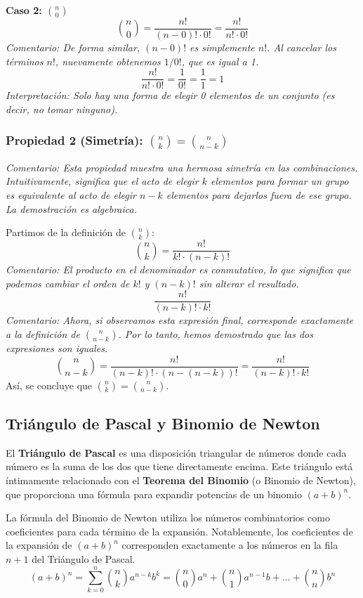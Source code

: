 \documentclass[12pt, letterpaper]{article}
\begin{document}
\vspace{1em}
\noindent \textbf{Caso 2: $\binom{n}{0}$}
\[ \binom{n}{0} = \frac{n!}{(n-0)! \cdot 0!} = \frac{n!}{n! \cdot 0!} \]
\textit{Comentario: De forma similar, $(n-0)!$ es simplemente $n!$. Al cancelar los términos $n!$, nuevamente obtenemos $1/0!$, que es igual a 1.}
\[ \frac{n!}{n! \cdot 0!} = \frac{1}{0!} = \frac{1}{1} = 1 \]
\textit{Interpretación: Solo hay una forma de elegir 0 elementos de un conjunto (es decir, no tomar ninguno).}

\subsubsection{\texorpdfstring{Propiedad 2 (Simetría): $\binom{n}{k} = \binom{n}{n-k}$}{Propiedad 2 (Simetría): C(n,k) = C(n,n-k)}}
\textit{Comentario: Esta propiedad muestra una hermosa simetría en las combinaciones. Intuitivamente, significa que el acto de elegir $k$ elementos para formar un grupo es equivalente al acto de elegir $n-k$ elementos para dejarlos fuera de ese grupo. La demostración es algebraica.}

\vspace{1em}
\noindent Partimos de la definición de $\binom{n}{k}$:
\[ \binom{n}{k} = \frac{n!}{k! \cdot (n-k)!} \]
\textit{Comentario: El producto en el denominador es conmutativo, lo que significa que podemos cambiar el orden de $k!$ y $(n-k)!$ sin alterar el resultado.}
\[ \frac{n!}{(n-k)! \cdot k!} \]
\textit{Comentario: Ahora, si observamos esta expresión final, corresponde exactamente a la definición de $\binom{n}{n-k}$. Por lo tanto, hemos demostrado que las dos expresiones son iguales.}
\[ \binom{n}{n-k} = \frac{n!}{(n-k)! \cdot (n-(n-k))!} = \frac{n!}{(n-k)! \cdot k!} \]
Así, se concluye que $\binom{n}{k} = \binom{n}{n-k}$.

\subsection{Triángulo de Pascal y Binomio de Newton}
El \textbf{Triángulo de Pascal} es una disposición triangular de números donde cada número es la suma de los dos que tiene directamente encima. Este triángulo está íntimamente relacionado con el \textbf{Teorema del Binomio} (o Binomio de Newton), que proporciona una fórmula para expandir potencias de un binomio $(a+b)^n$.

La fórmula del Binomio de Newton utiliza los números combinatorios como coeficientes para cada término de la expansión. Notablemente, los coeficientes de la expansión de $(a+b)^n$ corresponden exactamente a los números en la fila $n+1$ del Triángulo de Pascal.
\[ (a+b)^n = \sum_{k=0}^{n} \binom{n}{k} a^{n-k} b^k = \binom{n}{0}a^n + \binom{n}{1}a^{n-1}b + \dots + \binom{n}{n}b^n \]
\end{document}
